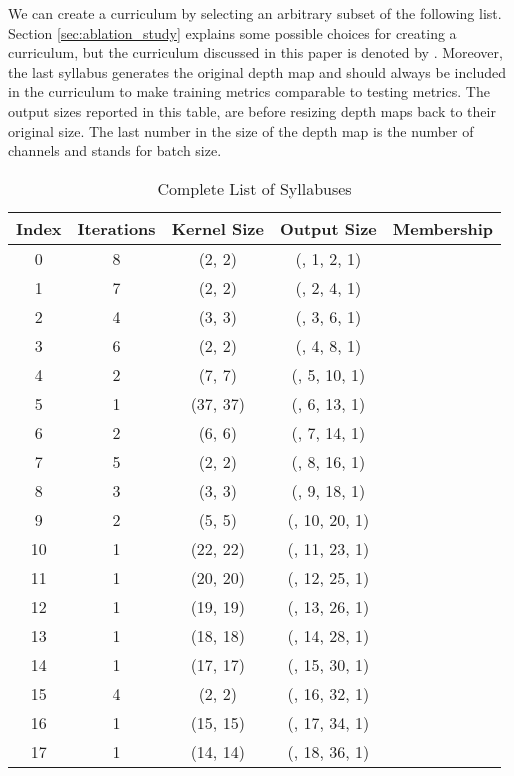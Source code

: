 \documentclass{article}
\begin{document}
\begin{table}[H]
\caption{Complete List of Syllabuses} We can create a curriculum by selecting an arbitrary subset of the following list. Section \ref{sec:ablation_study} explains some possible choices for creating a curriculum, but the curriculum discussed in this paper is denoted by . Moreover, the last syllabus generates the original depth map and should always be included in the curriculum to make training metrics comparable to testing metrics. The output sizes reported in this table, are before resizing depth maps back to their original size. The last number in the size of the depth map is the number of channels and  stands for batch size.
\label{tab:syllabuses}
\begin{center}
\begin{tabular}{ccccc}
\multicolumn{1}{c}{\bf Index}&\multicolumn{1}{c}{\bf Iterations}  &\multicolumn{1}{c}{\bf Kernel Size}&\multicolumn{1}{c}{\bf Output Size}&\multicolumn{1}{c}{\bf Membership}\\
\hline
0          &8    &(2, 2)      &(, 1, 2, 1)& \\
1          &7    &(2, 2)      &(, 2, 4, 1)& \\
2          &4    &(3, 3)      &(, 3, 6, 1)&  \\
3          &6    &(2, 2)      &(, 4, 8, 1)& \\
4          &2    &(7, 7)     &(, 5, 10, 1)& \\
5          &1  &(37, 37)     &(, 6, 13, 1)& \\
6          &2    &(6, 6)     &(, 7, 14, 1)& \\
7          &5    &(2, 2)     &(, 8, 16, 1)& \\
8          &3    &(3, 3)     &(, 9, 18, 1)& \\
9          &2    &(5, 5)    &(, 10, 20, 1)& \\
10         &1  &(22, 22)    &(, 11, 23, 1)& \\
11         &1  &(20, 20)    &(, 12, 25, 1)& \\
12         &1  &(19, 19)    &(, 13, 26, 1)& \\
13         &1  &(18, 18)    &(, 14, 28, 1)& \\
14         &1  &(17, 17)    &(, 15, 30, 1)& \\
15         &4    &(2, 2)    &(, 16, 32, 1)& \\
16         &1  &(15, 15)    &(, 17, 34, 1)& \\
17         &1  &(14, 14)    &(, 18, 36, 1)& \\

\end{tabular}
\end{center}
\end{table}
\end{document}
